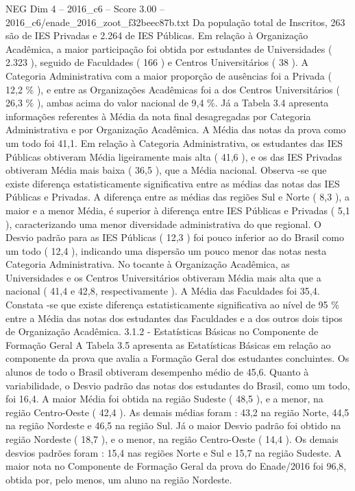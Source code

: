 \begin{textsample}{NEG Dim 4 – 2016\_c6 – Score 3.00 – 2016\_c6/enade\_2016\_zoot\_f32beec87b.txt}
Da população total de Inscritos, 263 são de IES Privadas e 2.264 de IES Públicas.
Em relação à Organização Acadêmica, a maior participação foi obtida por estudantes de Universidades ( 2.323 ), seguido de Faculdades ( 166 ) e Centros Universitários ( 38 ).
A Categoria Administrativa com a maior proporção de ausências foi a Privada ( 12,2 \% ), e entre as Organizações Acadêmicas foi a dos Centros Universitários ( 26,3 \% ), ambas acima do valor nacional de 9,4 \%.
Já a Tabela 3.4 apresenta informações referentes à Média da nota final desagregadas por Categoria Administrativa e por Organização Acadêmica.
A Média das notas da prova como um todo foi 41,1.
Em relação à Categoria Administrativa, os estudantes das IES Públicas obtiveram Média ligeiramente mais alta ( 41,6 ), e os das IES Privadas obtiveram Média mais baixa ( 36,5 ), que a Média nacional.
Observa -se que existe diferença estatisticamente significativa entre as médias das notas das IES Públicas e Privadas.
A diferença entre as médias das regiões Sul e Norte ( 8,3 ), a maior e a menor Média, é superior à diferença entre IES Públicas e Privadas ( 5,1 ), caracterizando uma menor diversidade administrativa do que regional.
O Desvio padrão para as IES Públicas ( 12,3 ) foi pouco inferior ao do Brasil como um todo ( 12,4 ), indicando uma dispersão um pouco menor das notas nesta Categoria Administrativa.
No tocante à Organização Acadêmica, as Universidades e os Centros Universitários obtiveram Média mais alta que a nacional ( 41,4 e 42,8, respectivamente ).
A Média das Faculdades foi 35,4.
Constata -se que existe diferença estatisticamente significativa ao nível de 95 \% entre a Média das notas dos estudantes das Faculdades e a dos outros dois tipos de Organização Acadêmica. 3.1.2 - Estatísticas Básicas no Componente de Formação Geral A Tabela 3.5 apresenta as Estatísticas Básicas em relação ao componente da prova que avalia a Formação Geral dos estudantes concluintes.
Os alunos de todo o Brasil obtiveram desempenho médio de 45,6.
Quanto à variabilidade, o Desvio padrão das notas dos estudantes do Brasil, como um todo, foi 16,4.
A maior Média foi obtida na região Sudeste ( 48,5 ), e a menor, na região Centro-Oeste ( 42,4 ).
As demais médias foram : 43,2 na região Norte, 44,5 na região Nordeste e 46,5 na região Sul.
Já o maior Desvio padrão foi obtido na região Nordeste ( 18,7 ), e o menor, na região Centro-Oeste ( 14,4 ).
Os demais desvios padrões foram : 15,4 nas regiões Norte e Sul e 15,7 na região Sudeste.
A maior nota no Componente de Formação Geral da prova do Enade/2016 foi 96,8, obtida por, pelo menos, um aluno na região Nordeste.

\end{textsample}
